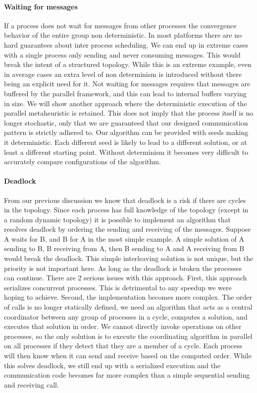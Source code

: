 \paragraph{Waiting for messages}
If a process does not wait for messages from other processes the convergence behavior of the entire group non deterministic. In most platforms there are no hard guarantees about inter process scheduling. We can end up in extreme cases with a single process only sending and never consuming messages. This would break the intent of a structured topology. While this is an extreme example, even in average cases an extra level of non determinism is introduced without there being an explicit need for it. Not waiting for messages requires that messages are buffered by the parallel framework, and this can lead to internal buffers varying in size.  We will show another approach where the deterministic execution of the parallel metaheuristic is retained. This does not imply that the process itself is no longer stochastic, only that we are guaranteed that our designed communication pattern is strictly adhered to. Our algorithm can be provided with seeds making it deterministic. Each different seed is likely to lead to a different solution, or at least a different starting point. Without determinism it becomes very difficult to accurately compare configurations of the algorithm.

\paragraph{Deadlock}
From our previous discussion we know that deadlock is a risk if there are cycles in the topology. Since each process has full knowledge of the topology (except in a random dynamic topology) it is possible to implement an algorithm that resolves deadlock by ordering the sending and receiving of the messages. Suppose A waits for B, and B for A in the most simple example. A simple solution of A sending to B, B receiving from A, then B sending to A and A receiving from B would break the deadlock. This simple interleaving solution is not unique, but the priority is not important here. As long as the deadlock is broken the processes can continue. There are 2 serious issues with this approach. First, this approach serializes concurrent processes. This is detrimental to any speedup we were hoping to achieve. Second, the implementation becomes more complex. The order of calls is no longer statically defined, we need an algorithm that acts as a central coordinator between any group of processes in a cycle, computes a solution, and executes that solution in order. We cannot directly invoke operations on other processes, so the only solution is to execute the coordinating algorithm in parallel on all processes if they detect that they are a member of a cycle. Each process will then know when it can send and receive based on the computed order. While this solves deadlock, we still end up with a serialized execution and the communication code becomes far more complex than a simple sequential sending and receiving call.

